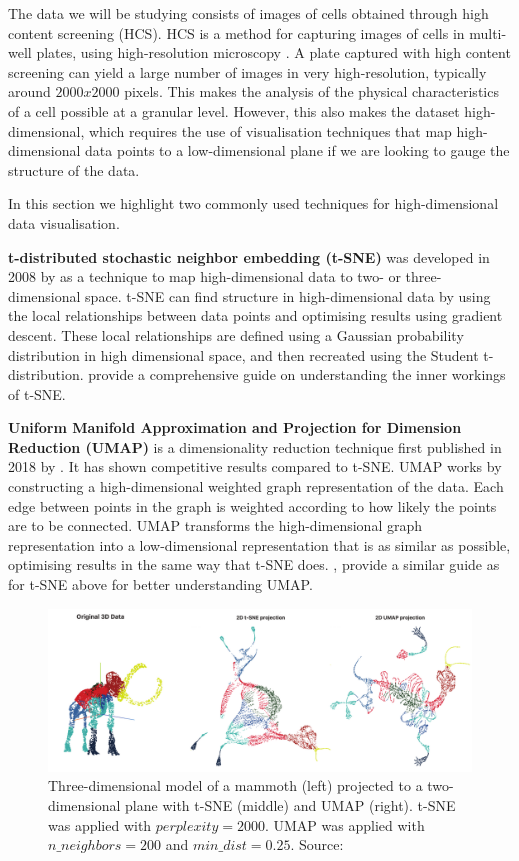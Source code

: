 The data we will be studying consists of images of cells obtained through high content screening (HCS). HCS is a method for capturing images of cells in multi-well plates, using high-resolution microscopy \citep{buchser_assay_2014}. A plate captured with high content screening can yield a large number of images in very high-resolution, typically around $2000x2000$ pixels. This makes the analysis of the physical characteristics of a cell possible at a granular level. However, this also makes the dataset high-dimensional, which requires the use of visualisation techniques that map high-dimensional data points to a low-dimensional plane if we are looking to gauge the structure of the data.

In this section we highlight two commonly used techniques for high-dimensional data visualisation.

\textbf{t-distributed stochastic neighbor embedding (t-SNE)} was developed in 2008 by \citeauthor{vanDerMaaten2008} as a technique to map high-dimensional data to two- or three-dimensional space. t-SNE can find structure in high-dimensional data by using the local relationships between data points and optimising results using gradient descent. These local relationships are defined using a Gaussian probability distribution in high dimensional space, and then recreated using the Student t-distribution. \citet{wattenberg2016how} provide a comprehensive guide on understanding the inner workings of t-SNE.

\textbf{Uniform Manifold Approximation and Projection for Dimension Reduction (UMAP)} is a dimensionality reduction technique first published in 2018 by \citeauthor{umap_arxiv}. It has shown competitive results compared to t-SNE. UMAP works by constructing a high-dimensional weighted graph representation of the data. Each edge between points in the graph is weighted according to how likely the points are to be connected. UMAP transforms the high-dimensional graph representation into a low-dimensional representation that is as similar as possible, optimising results in the same way that t-SNE does. \citet{Coenon2019}, provide a similar guide as for t-SNE above for better understanding UMAP.

\begin{figure}[h]
    \centering
    \includegraphics[width=\textwidth]{dissertation/figures/mammoth_vis.pdf}
    \caption{Three-dimensional model of a mammoth (left) projected to a two-dimensional plane with t-SNE (middle) and UMAP (right). t-SNE was applied with  $perplexity=2000$. UMAP was applied with $n\_neighbors=200$ and $min\_dist=0.25$. Source: \citet{Coenon2019}}
    \label{fig:vis_mammoth}
\end{figure}

